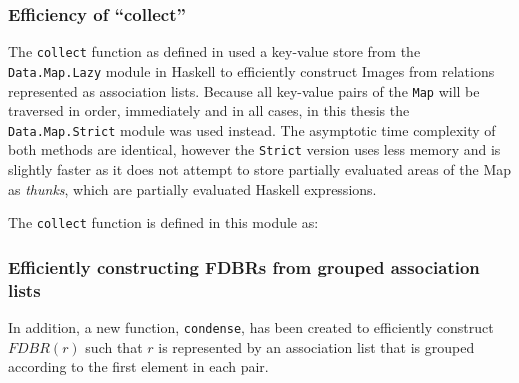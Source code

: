 \documentclass[../main.tex]{subfiles}
\begin{document}
\subsubsection{Efficiency of ``collect''}

The \texttt{collect} function as defined in \cite{agboola2015extensible} used a key-value store from the \texttt{Data.Map.Lazy} module in Haskell to efficiently construct Images from relations represented as association lists.  Because all key-value pairs of the \texttt{Map} will be traversed in order, immediately and in all cases, in this thesis the \texttt{Data.Map.Strict} module was used instead.  The asymptotic time complexity of both methods are identical, however the \texttt{Strict} version uses less memory and is slightly faster as it does not attempt to store partially evaluated areas of the Map as {\em thunks}, which are partially evaluated Haskell expressions.

The \texttt{collect} function is defined in this module as:







\subsubsection{Efficiently constructing FDBRs from grouped association lists}
In addition, a new function, \texttt{condense}, has been created to efficiently construct $FDBR(r)$ such that $r$ is represented by an association list that is grouped according to the first element in each pair.
\end{document}
